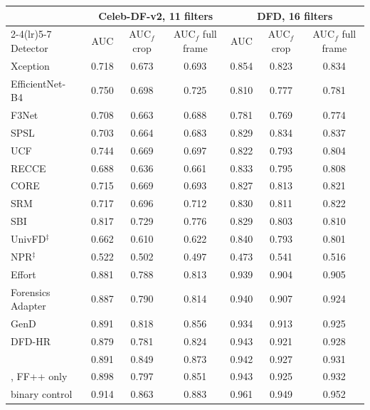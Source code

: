 \begin{tabular}{@{}l ccc ccc@{}}
\toprule
 & \multicolumn{3}{c}{Celeb-DF-v2, 11 filters} & \multicolumn{3}{c}{DFD, 16 filters} \\
\cmidrule(lr){2-4}\cmidrule(lr){5-7}
Detector & AUC & AUC$_f$ crop & AUC$_f$ full frame & AUC & AUC$_f$ crop & AUC$_f$ full frame \\
\midrule
Xception~\cite{xception} & 0.718 & 0.673 & 0.693 & 0.854 & 0.823 & 0.834 \\
EfficientNet-B4~\cite{efficientnet} & 0.750 & 0.698 & 0.725 & 0.810 & 0.777 & 0.781 \\
F3Net~\cite{f3net} & 0.708 & 0.663 & 0.688 & 0.781 & 0.769 & 0.774 \\
SPSL~\cite{spsl} & 0.703 & 0.664 & 0.683 & 0.829 & 0.834 & 0.837 \\
UCF~\cite{ucf} & 0.744 & 0.669 & 0.697 & 0.822 & 0.793 & 0.804 \\
RECCE~\cite{recce} & 0.688 & 0.636 & 0.661 & 0.833 & 0.795 & 0.808 \\
CORE~\cite{core} & 0.715 & 0.669 & 0.693 & 0.827 & 0.813 & 0.821 \\
SRM~\cite{srm} & 0.717 & 0.696 & 0.712 & 0.830 & 0.811 & 0.822 \\
SBI~\cite{sbi} & 0.817 & 0.729 & 0.776 & 0.829 & 0.803 & 0.810 \\
UnivFD$^\ddagger$~\cite{univfd} & 0.662 & 0.610 & 0.622 & 0.840 & 0.793 & 0.801 \\
NPR$^\ddagger$~\cite{npr} & 0.522 & 0.502 & 0.497 & 0.473 & 0.541 & 0.516 \\
Effort~\cite{effort} & 0.881 & 0.788 & 0.813 & 0.939 & 0.904 & 0.905 \\
Forensics Adapter~\cite{forensicsadapter} & 0.887 & 0.790 & 0.814 & 0.940 & 0.907 & 0.924 \\
GenD~\cite{gend2026} & 0.891 & 0.818 & 0.856 & 0.934 & 0.913 & 0.925 \\
DFD-HR~\cite{dfdhr2026} & 0.879 & 0.781 & 0.824 & 0.943 & 0.921 & 0.928 \\
\ours{} & 0.891 & 0.849 & 0.873 & 0.942 & 0.927 & 0.931 \\
\ours{}, FF++ only & 0.898 & 0.797 & 0.851 & 0.943 & 0.925 & 0.932 \\
binary control & 0.914 & 0.863 & 0.883 & 0.961 & 0.949 & 0.952 \\
\bottomrule
\end{tabular}
